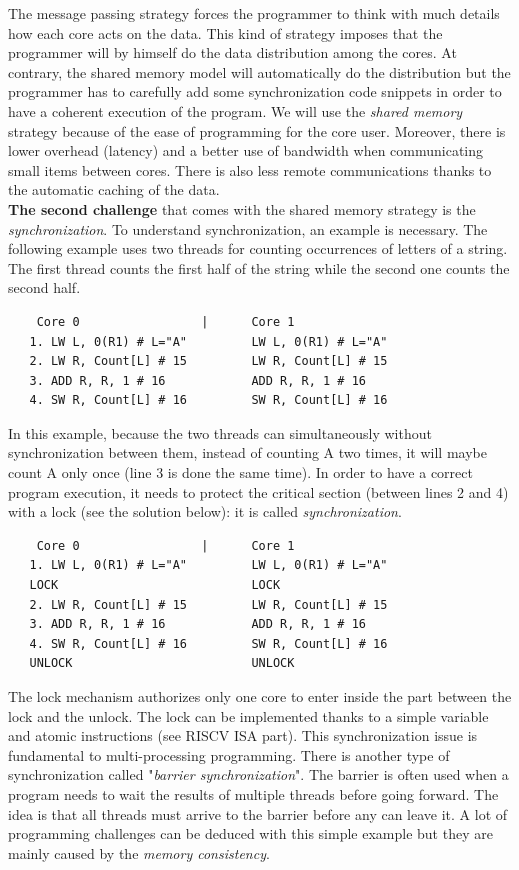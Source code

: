 \documentclass[10pt,letterpaper]{article}
\begin{document}
The message passing strategy forces the programmer to think with much details how each core acts on the data. This kind of strategy imposes that the programmer will by himself do the data distribution among the cores. At contrary, the shared memory model will automatically do the distribution but the programmer has to carefully add some synchronization code snippets in order to have a coherent execution of the program. We will use the \textit{shared memory} strategy because of the ease of programming for the core user. Moreover, there is lower overhead (latency) and a better use of bandwidth when communicating small items between cores. There is also less remote communications thanks to the automatic caching of the data.\\

\textbf{The second challenge} that comes with the shared memory strategy is the \textit{synchronization}. To understand synchronization, an example is necessary. The following example uses two threads for counting occurrences of letters of a string. The first thread counts the first half of the string while the second one counts the second half.

\begin{verbatim}
    Core 0                 |      Core 1
   1. LW L, 0(R1) # L="A"         LW L, 0(R1) # L="A"  
   2. LW R, Count[L] # 15         LW R, Count[L] # 15
   3. ADD R, R, 1 # 16            ADD R, R, 1 # 16
   4. SW R, Count[L] # 16         SW R, Count[L] # 16
\end{verbatim}

In this example, because the two threads can simultaneously without synchronization between them, instead of counting A two times, it will maybe count A only once (line 3 is done the same time). In order to have a correct program execution, it needs to protect the critical section (between lines 2 and 4) with a lock (see the solution below): it is called \textit{synchronization}.

\begin{verbatim}
    Core 0                 |      Core 1
   1. LW L, 0(R1) # L="A"         LW L, 0(R1) # L="A"  
   LOCK                           LOCK
   2. LW R, Count[L] # 15         LW R, Count[L] # 15
   3. ADD R, R, 1 # 16            ADD R, R, 1 # 16
   4. SW R, Count[L] # 16         SW R, Count[L] # 16
   UNLOCK                         UNLOCK
\end{verbatim}

The lock mechanism authorizes only one core to enter inside the part between the lock and the unlock. The lock can be implemented thanks to a simple variable and atomic instructions (see RISCV ISA part). This synchronization issue is fundamental to multi-processing programming. There is another type of synchronization called "\textit{barrier synchronization}". The barrier is often used when a program needs to wait the results of multiple threads before going forward. The idea is that all threads must arrive to the barrier before any can leave it. A lot of programming challenges can be deduced with this simple example but they are mainly caused by the \textit{memory consistency}.\\
\end{document}
